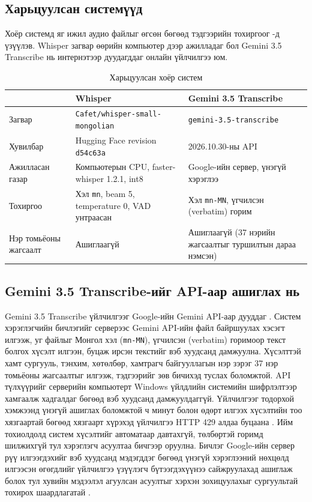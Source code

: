 \subsection{Харьцуулсан системүүд}
\label{sec:stt-systems}

Хоёр системд яг ижил аудио файлыг өгсөн бөгөөд тэдгээрийн тохиргоог -д үзүүлэв. Whisper загвар өөрийн компьютер дээр ажилладаг бол Gemini 3.5 Transcribe нь интернэтээр дуудагддаг онлайн үйлчилгээ юм.

\begin{table}[htbp]
\centering
\caption{Харьцуулсан хоёр систем}
\label{tab:stt_setup}
\begin{tabular}{|p{3.0cm}|p{5.4cm}|p{5.2cm}|}
\hline
 & \textbf{Whisper} & \textbf{Gemini 3.5 Transcribe} \\
\hline
Загвар & \texttt{Cafet/\allowbreak whisper-small-\allowbreak mongolian} \cite{cafet_whisper_small_mn} & \texttt{gemini-3.5-transcribe} \cite{google_transcribe_model} \\
\hline
Хувилбар & Hugging Face revision \texttt{d54c63a} & 2026.10.30-ны API \\
\hline
Ажилласан газар & Компьютерын CPU, faster-whisper 1.2.1, int8 & Google-ийн сервер, үнэгүй хэрэглээ \\
\hline
Тохиргоо & Хэл \texttt{mn}, beam 5, temperature 0, VAD унтраасан & Хэл \texttt{mn-MN}, үгчилсэн (verbatim) горим \\
\hline
Нэр томьёоны жагсаалт & Ашиглаагүй & Ашиглаагүй (37 нэрийн жагсаалтыг туршилтын дараа нэмсэн) \\
\hline
\end{tabular}
\end{table}

\subsection{Gemini 3.5 Transcribe-ийг API-аар ашиглах нь}
\label{sec:stt-api}

Gemini 3.5 Transcribe үйлчилгээг Google-ийн Gemini API-аар дууддаг \cite{google_transcribe_model}. Систем хэрэглэгчийн бичлэгийг серверээс Gemini API-ийн файл байршуулах хэсэгт илгээж, уг файлыг Монгол хэл (\texttt{mn-MN}), үгчилсэн (verbatim) горимоор текст болгох хүсэлт илгээн, буцаж ирсэн текстийг вэб хуудсанд дамжуулна. Хүсэлттэй хамт сургууль, тэнхим, хөтөлбөр, хамтрагч байгууллагын нэр зэрэг 37 нэр томьёоны жагсаалтыг илгээж, тэдгээрийг зөв бичихэд туслах боломжтой. API түлхүүрийг серверийн компьютерт Windows үйлдлийн системийн шифрлэлтээр хамгаалж хадгалдаг бөгөөд вэб хуудсанд дамжуулдаггүй. Үйлчилгээг тодорхой хэмжээнд үнэгүй ашиглах боломжтой ч минут болон өдөрт илгээх хүсэлтийн тоо хязгаартай бөгөөд хязгаарт хүрэхэд үйлчилгээ HTTP 429 алдаа буцаана \cite{google_rate_limits}. Ийм тохиолдолд систем хүсэлтийг автоматаар давтахгүй, төлбөртэй горимд шилжихгүй тул хэрэглэгч асуултаа бичгээр оруулна. Бичлэг Google-ийн сервер рүү илгээгдэхийг вэб хуудсанд мэдэгддэг бөгөөд үнэгүй хэрэглээний нөхцөлд илгээсэн өгөгдлийг үйлчилгээ үзүүлэгч бүтээгдэхүүнээ сайжруулахад ашиглаж болох тул хувийн мэдээлэл агуулсан асуултыг хэрхэн зохицуулахыг сургуультай тохирох шаардлагатай \cite{google_terms}.

